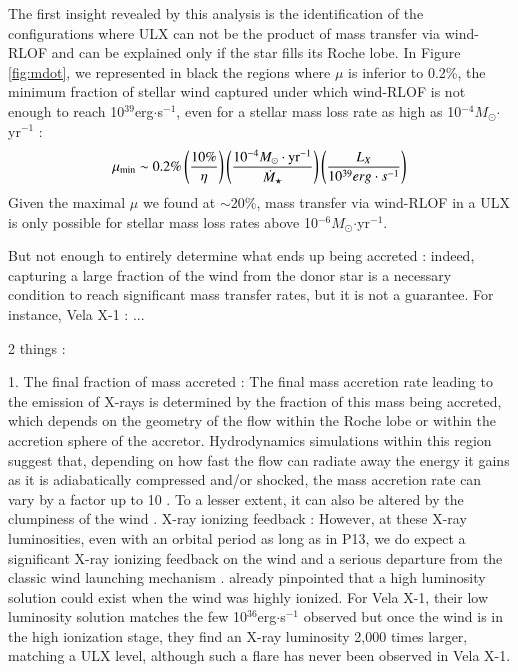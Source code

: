 \documentclass[letter]{aa}
\makeatletter
\newcommand{\ulx}{ULX\xspace}
\newcommand*{\rlof}{RLOF\@\xspace}
\newcommand{\mystar}{{\fontfamily{lmr}\selectfont$\star$}}
\newcommand*{\msun}{$M_{\odot}$\@\xspace}
\newcommand*{\mdotstar}{$\dot{M}_{\text{\mystar}}$\@\xspace}
\makeatother
\begin{document}
The first insight revealed by this analysis is the identification of the configurations where \ulx can not be the product of mass transfer via wind-\rlof and can be explained only if the star fills its Roche lobe. In Figure\,\ref{fig:mdot}, we represented in black the regions where $\mu$ is inferior to 0.2\%, the minimum fraction of stellar wind captured under which wind-\rlof is not enough to reach 10$^{39}$erg$\cdot$s$^{-1}$, even for a stellar mass loss rate as high as 10$^{-4}$\msun$\cdot$yr$^{-1}$ :
\begin{equation}
\mu_{\text{min}}\sim 0.2\%\left(\frac{10\%}{\eta}\right)\left(\frac{10^{-4}\text{\msun}\cdot\text{yr}^{-1}}{\text{\mdotstar}}\right)\left(\frac{L_X}{10^{39}erg\cdot s^{-1}}\right)
\end{equation} 
Given the maximal $\mu$ we found at $\sim$20\%, mass transfer via wind-\rlof in a \ulx is only possible for stellar mass loss rates above 10$^{-6}$\msun$\cdot$yr$^{-1}$.

But not enough to entirely determine what ends up being accreted : indeed, capturing a large fraction of the wind from the donor star is a necessary condition to reach significant mass transfer rates, but it is not a guarantee. For instance, Vela X-1 : ...

2 things :

1. The final fraction of mass accreted : The final mass accretion rate leading to the emission of X-rays is determined by the fraction of this mass being accreted, which depends on the geometry of the flow within the Roche lobe or within the accretion sphere of the accretor. Hydrodynamics simulations within this region suggest that, depending on how fast the flow can radiate away the energy it gains as it is adiabatically compressed and/or shocked, the mass accretion rate can vary by a factor up to 10 \cite{ElMellah2019}. To a lesser extent, it can also be altered by the clumpiness of the wind \citep{Sundqvist2017,ElMellah}.
X-ray ionizing feedback : However, at these X-ray luminosities, even with an orbital period as long as in P13, we do expect a significant X-ray ionizing feedback on the wind and a serious departure from the classic wind launching mechanism \citep{Hatchett1977,Stevens1991}. \cite{Ho1987} already pinpointed that a high luminosity solution could exist when the wind was highly ionized. For Vela X-1, their low luminosity solution matches the few 10$^{36}$erg$\cdot$s$^{-1}$ observed but once the wind is in the high ionization stage, they find an X-ray luminosity 2,000 times larger, matching a \ulx level, although such a flare has never been observed in Vela X-1.
\end{document}
